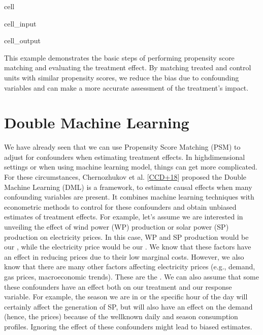 \documentclass[letterpaper,10pt,english]{jupyterBook}
\begin{document}
\begin{sphinxuseclass}{cell}
\begin{sphinxVerbatimInput}
\begin{sphinxuseclass}{cell_input}
\end{sphinxuseclass}\end{sphinxVerbatimInput}
\begin{sphinxVerbatimOutput}

\begin{sphinxuseclass}{cell_output}
\noindent{}

\end{sphinxuseclass}\end{sphinxVerbatimOutput}

\end{sphinxuseclass}
\sphinxAtStartPar
This example demonstrates the basic steps of performing propensity score matching and evaluating the treatment effect. By matching treated and control units with similar propensity scores, we reduce the bias due to confounding variables and can make a more accurate assessment of the treatment’s impact.

\sphinxstepscope


\chapter{Double Machine Learning}
\label{\detokenize{notebooks/double_machine_learning:double-machine-learning}}\label{\detokenize{notebooks/double_machine_learning::doc}}
\sphinxAtStartPar
We have already seen that we can use Propensity Score Matching (PSM) to adjust for confounders when estimating treatment effects. In high\sphinxhyphen{}dimensional settings or when using machine learning model, things can get more complicated. For these circumstances, Chernozhukov et al. {[}\hyperlink{cite.bibliography:id9}{CCD+18}{]} proposed the Double Machine Learning (DML) is a framework, to estimate causal effects when many confounding variables are present. It combines machine learning techniques with econometric methods to control for these confounders and obtain unbiased estimates of treatment effects. For example, let’s assume we are interested in unveiling the effect of wind power (WP) production or solar power (SP) production on electricity prices. In this case, WP and SP production would be our , while the electricity price would be our . We know that these factors have an effect in reducing prices due to their low marginal costs. However, we also know that there are many other factors affecting electricity prices (e.g., demand, gas prices, macroeconomic trends). These are the . We can also assume that some these confounders have an effect both on our treatment and our response variable. For example, the season we are in or the specific hour of the day will certainly affect the generation of SP, but will also have an effect on the demand (hence, the prices) because of the well\sphinxhyphen{}known daily and season consumption profiles. Ignoring the effect of these confounders might lead to biased estimates.
\end{document}
